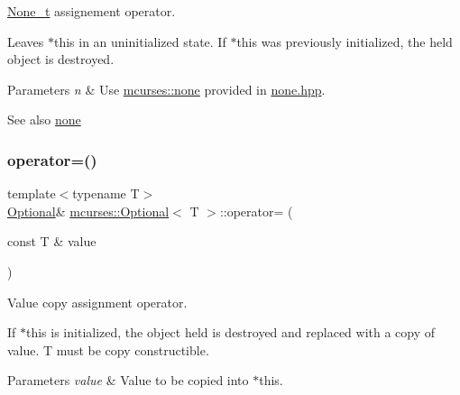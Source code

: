 \hyperlink{classmcurses_1_1None__t}{None\+\_\+t} assignement operator. 

Leaves $\ast$this in an uninitialized state. If $\ast$this was previously initialized, the held object is destroyed. 
\begin{DoxyParams}{Parameters}
{\em n} & Use \hyperlink{namespacemcurses_a3fd18c73e6d453dcdfdd1fcdaf9bb0d7}{mcurses\+::none} provided in \hyperlink{none_8hpp}{none.\+hpp}. \\
\hline
\end{DoxyParams}
\begin{DoxySeeAlso}{See also}
\hyperlink{namespacemcurses_a3fd18c73e6d453dcdfdd1fcdaf9bb0d7}{none} 
\end{DoxySeeAlso}
\hypertarget{classmcurses_1_1Optional_ac77b0ca69b51f7d176983812d95c0807}{}\label{classmcurses_1_1Optional_ac77b0ca69b51f7d176983812d95c0807} 
\subsubsection{\texorpdfstring{operator=()}{operator=()}\hspace{0.1cm}{\footnotesize\ttfamily [4/7]}}
{\footnotesize\ttfamily template$<$typename T$>$ \\
\hyperlink{classmcurses_1_1Optional}{Optional}\& \hyperlink{classmcurses_1_1Optional}{mcurses\+::\+Optional}$<$ T $>$\+::operator= (\begin{DoxyParamCaption}\item[{const T \&}]{value }\end{DoxyParamCaption})\hspace{0.3cm}{\ttfamily [inline]}}



Value copy assignment operator. 

If $\ast$this is initialized, the object held is destroyed and replaced with a copy of {\ttfamily value}. T must be copy constructible. 
\begin{DoxyParams}{Parameters}
{\em value} & Value to be copied into $\ast$this. \\
\hline
\end{DoxyParams}
\hypertarget{classmcurses_1_1Optional_a023f00ae051bce4f61885e8bbfd14106}{}\label{classmcurses_1_1Optional_a023f00ae051bce4f61885e8bbfd14106} 
